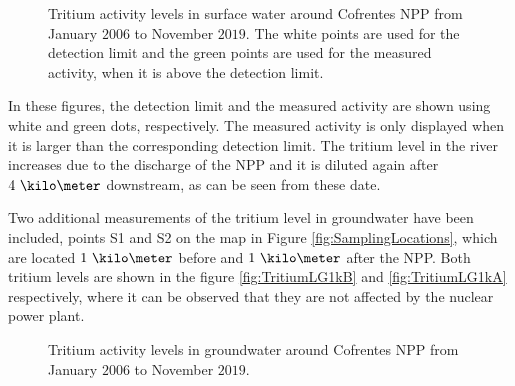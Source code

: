 \begin{figure}[hbtp]
 \centering
    \newline
    \newline
 \caption{Tritium activity levels in surface water around Cofrentes NPP from January $2006$ to November $2019$. The white points are used for the detection limit and the green points are used for the measured activity, when it is above the detection limit.~\cite{REM}}
 \label{fig:MeasurementsCofrentesSurface}
\end{figure}

In these figures, the detection limit and the measured activity are shown using white and green dots, respectively. The measured activity is only displayed when it is larger than the corresponding detection limit. The tritium level in the river increases due to the discharge of the NPP and it is diluted again after $4~\kilo\meter$ downstream, as can be seen from these date. 

Two additional measurements of the tritium level in groundwater have been included, points S1 and S2 on the map in Figure \ref{fig:SamplingLocations}, which are located $1~\kilo\meter$ before and $1~\kilo\meter$ after the NPP. Both tritium levels are shown in the figure \ref{fig:TritiumLG1kB} and \ref{fig:TritiumLG1kA} respectively, where it can be observed that they are not affected by the nuclear power plant.

\begin{figure}[hbtp]
 \centering
    \newline
 \caption{Tritium activity levels in groundwater around Cofrentes NPP from January $2006$ to November $2019$.~\cite{REM}}
 \label{fig:MeasurementsCofrentesGroundWater}
\end{figure}

